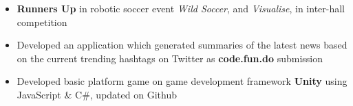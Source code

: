 
\begin{itemize}
  \item \textbf{Runners Up} in robotic soccer event \emph{Wild Soccer}, and \emph{Visualise}, in inter-hall competition
  \item Developed an application which generated summaries of the latest news based on the current trending hashtags on Twitter as \textbf{code.fun.do} submission
  \item Developed basic platform game on game development framework \textbf{Unity} using JavaScript \& C\#, updated on Github
    \vspace{-1mm}
\end{itemize}
